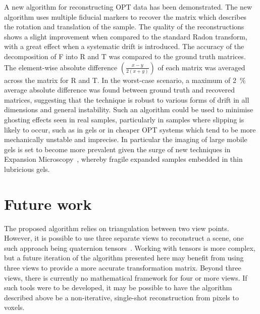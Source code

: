 \documentclass{osa-article}
\begin{document}
A new algorithm for reconstructing OPT data has been demonstrated.
The new algorithm uses multiple fiducial markers to recover the matrix which describes the rotation and translation of the sample.
The quality of the reconstructions shows a slight improvement when compared to the standard Radon transform, with a great effect when a systematic drift is introduced.
The accuracy of the decomposition of \gls*{F} into \gls*{R} and \gls*{T} was compared to the ground truth matrices.
The element-wise absolute difference \(\left(\frac{x-y}{2(x+y)}\right)\) of each matrix was averaged across the matrix for \gls*{R} and \gls*{T}.
In the worst-case scenario, a maximum of \SI{2}{\percent} average absolute difference was found between ground truth and recovered matrices,
suggesting that the technique is robust to various forms of drift in all dimensions and general instability.
Such an algorithm could be used to minimise ghosting effects seen in real samples, particularly in samples where slipping is likely to occur, such as in gels or in cheaper OPT systems which tend to be more mechanically unstable and imprecise.
In particular the imaging of large mobile gels is set to become more prevalent given the surge of new techniques in Expansion Microscopy~\cite{chenExpansionMicroscopy2015}, whereby fragile expanded samples embedded in thin lubricious gels.

\section*{Future work}

The proposed algorithm relies on triangulation between two view points.
However, it is possible to use three separate views %
to reconstruct a scene, one such approach being quaternion tensors~\cite{hartleyMultipleViewGeometry}.
Working with tensors is more complex, but a future iteration of the algorithm presented here may benefit from using three views to provide a more accurate transformation matrix.
Beyond three views, there is currently no mathematical framework for four or more views.
If such tools were to be developed, it may be possible to have the algorithm described above be a non-iterative, single-shot reconstruction from pixels to voxels.
\end{document}
